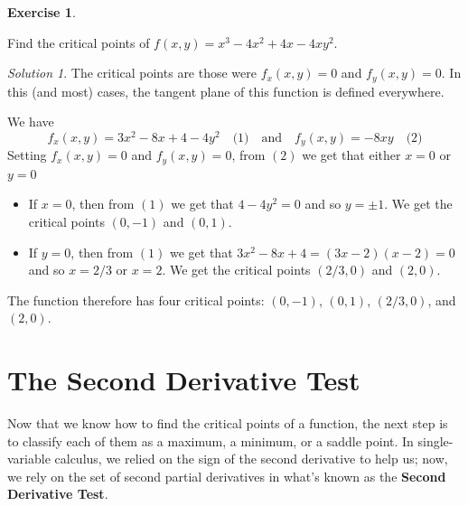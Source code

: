 \documentclass[
]{book}
\providecommand{\tightlist}{%
  \setlength{\itemsep}{0pt}\setlength{\parskip}{0pt}}
\theoremstyle{definition}
\theoremstyle{definition}
\theoremstyle{definition}
\newtheorem{exercise}{Exercise}[chapter]
\theoremstyle{definition}
\theoremstyle{remark}
\newtheorem*{solution}{Solution}
\begin{document}
\begin{exercise}
\protect\hypertarget{exr:unlabeled-div-58}{}\label{exr:unlabeled-div-58}

Find the critical points of \(f(x,y)= x^3-4x^2+4x-4xy^2\).

\end{exercise}

\begin{solution}

The critical points are those were \(f_x(x,y)=0\) and \(f_y(x,y)=0\). In this (and most) cases, the tangent plane of this function is defined everywhere.

We have
\[f_x(x,y) = 3x^2-8x+4-4y^2 \quad \mbox{(1)} \quad \mbox{and} \quad f_y(x,y)= -8xy \quad \mbox{(2)}\]
Setting \(f_x(x,y)=0\) and \(f_y(x,y)=0\), from \((2)\) we get that either \(x=0\) or \(y=0\)

\begin{itemize}
\tightlist
\item
  If \(x=0\), then from \((1)\) we get that \(4-4y^2=0\) and so \(y=\pm 1\). We get the critical points \((0,-1)\) and \((0,1)\).
\item
  If \(y=0\), then from \((1)\) we get that \(3x^2-8x+4=(3x-2)(x-2)=0\) and so \(x=2/3\) or \(x=2\). We get the critical points \((2/3, 0)\) and \((2,0)\).
\end{itemize}

The function therefore has four critical points: \((0,-1)\), \((0,1)\), \((2/3, 0)\), and \((2,0)\).

\end{solution}

\hypertarget{the-second-derivative-test}{%
\section{The Second Derivative Test}\label{the-second-derivative-test}}

Now that we know how to find the critical points of a function, the next step is to classify each of them as a maximum, a minimum, or a saddle point. In single-variable calculus, we relied on the sign of the second derivative to help us; now, we rely on the set of second partial derivatives in what's known as the \textbf{Second Derivative Test}.
\end{document}
